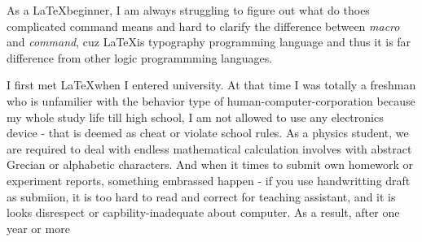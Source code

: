     As a \LaTeX beginner, I am always struggling  to figure out what do thoes complicated command means and hard to clarify the difference between \emph{macro} and \emph{command}, cuz \LaTeX is typography programming language and thus it is far difference from other logic programmming languages. 

    I first met \LaTeX when I entered university. At that time I was totally a freshman who is unfamilier with the behavior type of human-computer-corporation because my whole study life till high school, I am not allowed to use any electronics device - that is deemed as cheat or violate school rules. As a physics student, we are required to deal with endless mathematical calculation involves with abstract Grecian or alphabetic characters. And when it times to submit own homework or experiment reports, something embrassed happen - if you use handwritting draft as submiion, it is too hard to read and correct for teaching assistant, and it is looks disrespect or capbility-inadequate about computer. As a result, after one year or more 